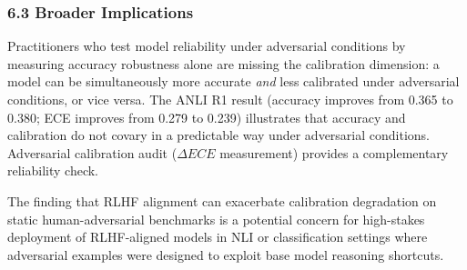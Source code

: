 \subsubsection{6.3 Broader Implications}

Practitioners who test model reliability under adversarial conditions by measuring accuracy robustness alone are missing the calibration dimension: a model can be simultaneously more accurate \textit{and} less calibrated under adversarial conditions, or vice versa. The ANLI R1 result (accuracy improves from 0.365 to 0.380; ECE improves from 0.279 to 0.239) illustrates that accuracy and calibration do not covary in a predictable way under adversarial conditions. Adversarial calibration audit ($\Delta ECE$ measurement) provides a complementary reliability check.

The finding that RLHF alignment can exacerbate calibration degradation on static human-adversarial benchmarks is a potential concern for high-stakes deployment of RLHF-aligned models in NLI or classification settings where adversarial examples were designed to exploit base model reasoning shortcuts.

